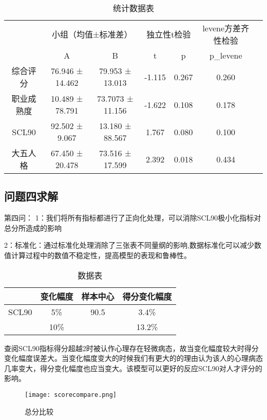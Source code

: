 \documentclass[withoutpreface,bwprint]{cumcmthesis} %
\begin{document}
\begin{table}[h]
    \centering
    \begin{tabular}{ccccccc}
        \toprule
        & \multicolumn{2}{c}{小组（均值±标准差）} & \multicolumn{2}{c}{独立性t检验} & \multicolumn{1}{c}{levene方差齐性检验} \\ 
        \cmidrule(lr){2-3} \cmidrule(lr){4-5} \cmidrule(lr){6-6}
        & A & B & t & p & p\_levene \\ \midrule
        综合评分 & 76.946 ± 14.462 & 79.953 ± 13.013 & -1.115 & 0.267 & 0.260 \\ 
        职业成熟度 & 10.489 ± 78.791 & 73.7073 ± 11.156 & -1.622 & 0.108 & 0.178 \\ 
        SCL90 & 92.502 ± 9.067 & 13.180 ± 88.567 & 1.767 & 0.080 & 0.100 \\ 
        大五人格 & 67.450 ± 20.478 & 73.516 ± 17.599 & 2.392 & 0.018 & 0.434 \\ \bottomrule
    \end{tabular}
    \caption{统计数据表}
    \label{tab:statistics}
\end{table}



\subsection{问题四求解}



第四问：
1：我们将所有指标都进行了正向化处理，可以消除SCL90极小化指标对总分所造成的影响

2：标准化：通过标准化处理消除了三张表不同量纲的影响,数据标准化可以减少数值计算过程中的数值不稳定性，提高模型的表现和鲁棒性。

\begin{table}[h]
    \centering
    \begin{tabular}{cccc}
        \toprule
        & 变化幅度 & 样本中心 & 得分变化幅度 \\ \midrule
        SCL90 & 5\% & 90.5 & 3.4\% \\ 
              & 10\% & & 13.2\% \\ 
        \bottomrule
    \end{tabular}
    \caption{数据表}
    \label{tab:data}
\end{table}
查阅SCL90指标得分超越2时被认作心理存在轻微病态，故当变化幅度较大时得分变化幅度误差大。当变化幅度变大的时候我们有更大的的理由认为该人的心理病态几率变大，得分变化幅度也应当变大。该模型可以更好的反应SCL90对人才评分的影响。
\begin{figure}[!h]
    \centering
    \texttt{[image: scorecompare.png]}
    \caption{总分比较}
    \label{fig:scorecompare}
\end{figure}
\end{document}
